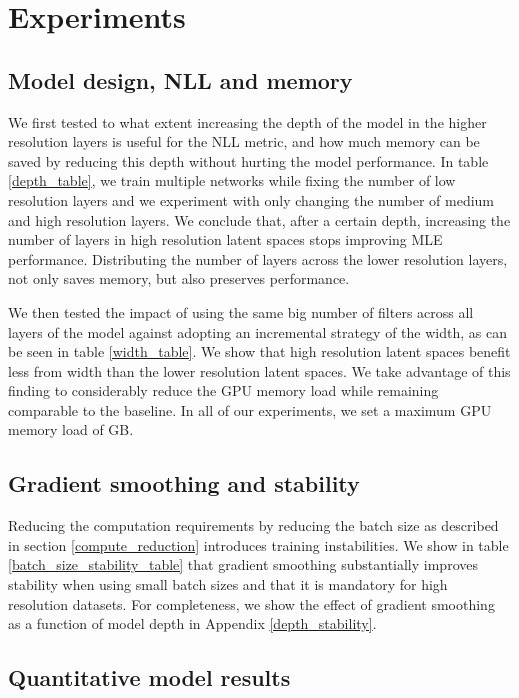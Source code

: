 \documentclass{article}
\begin{document}
\section{Experiments}
\label{experiments}

\subsection{Model design, NLL and memory}\label{design_nll_mem}
We first tested to what extent increasing the depth of the model in the higher resolution layers is useful for the NLL metric, and how much memory can be saved by reducing this depth without hurting the model performance. In table \ref{depth_table}, we train multiple networks while fixing the number of low resolution layers and we experiment with only changing the number of medium and high resolution layers. We conclude that, after a certain depth, increasing the number of layers in high resolution latent spaces stops improving MLE performance. Distributing the number of layers across the lower resolution layers, not only saves memory, but also preserves performance. 

We then tested the impact of using the same big number of filters across all layers of the model against adopting an incremental strategy of the width, as can be seen in table \ref{width_table}. We show that high resolution latent spaces benefit less from width than the lower resolution latent spaces. We take advantage of this finding to considerably reduce the GPU memory load while remaining comparable to the baseline. In all of our experiments, we set a maximum GPU memory load of GB.


\subsection{Gradient smoothing and stability}\label{grad_smooth_stabl}
Reducing the computation requirements by reducing the batch size as described in section \ref{compute_reduction} introduces training instabilities. We show in table \ref{batch_size_stability_table} that gradient smoothing substantially improves stability when using small batch sizes and that it is mandatory for high resolution datasets. For completeness, we show the effect of gradient smoothing as a function of model depth in Appendix \ref{depth_stability}.


\subsection{Quantitative model results}
\end{document}
